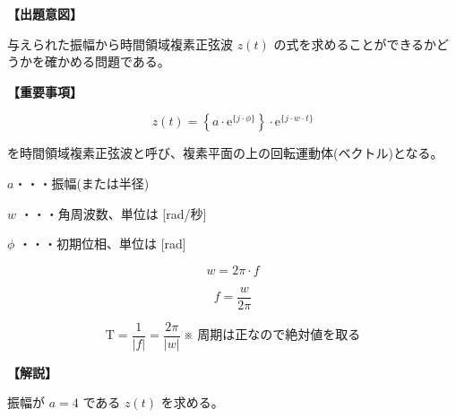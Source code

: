 \noindent \textbf{【出題意図】}

\bigskip
\noindent 与えられた振幅から時間領域複素正弦波 $z(t)$ の式を求めることができるかどうかを確かめる問題である。

\vspace{1em}
\noindent \textbf{【重要事項】}

\[
z(t) =  \left \{ a \cdot \textrm{e}^{\{j \cdot \phi\}} \right \} 
\cdot \textrm{e}^{\{j \cdot w \cdot t \}}
\]

\bigskip
\noindent を時間領域複素正弦波と呼び、複素平面の上の回転運動体(ベクトル)となる。

\bigskip
\noindent\quad  $a$・・・振幅(または半径)

\bigskip
\noindent\quad $w$ ・・・角周波数、単位は [rad/秒]

\bigskip
\noindent\quad $\phi$ ・・・初期位相、単位は [rad]

\[
w = 2\pi \cdot f
\]

\[
f = \frac{w}{2\pi} 
\]

\[
\textrm{T} = \frac{1}{|f|} = \frac{2\pi}{|w|}   \ \mbox{※ 周期は正なので絶対値を取る}
\]

\bigskip

\vspace{1em}
\noindent \textbf{【解説】}

\bigskip
\noindent 振幅が $a = 4$ である $z(t)$ を求める。
